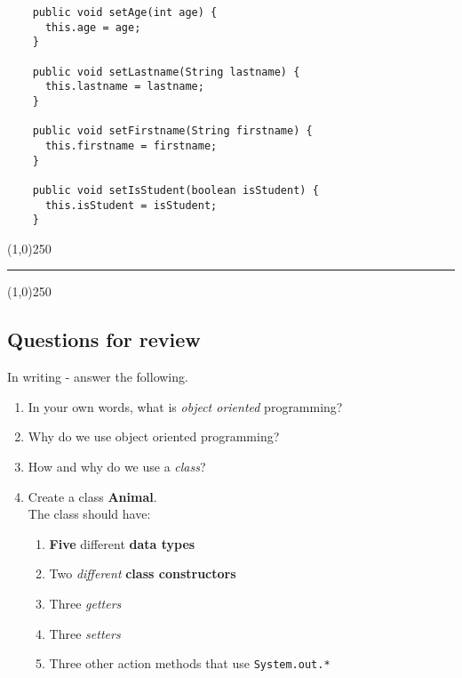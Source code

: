 \documentclass{article}
\begin{document}
\begin{flushleft}
\begin{tcolorbox}[enhanced,breakable, before upper={\let\clearpage\relax}, width=4in,center upper,
    fontupper=\bfseries,drop fuzzy shadow southeast,
    boxrule=0.4pt,sharp corners,colframe=gray!80!black,colback=gray!10]
  \begin{verbatim}
    public void setAge(int age) {
      this.age = age;
    }
    
    public void setLastname(String lastname) {
      this.lastname = lastname;
    }
    
    public void setFirstname(String firstname) {
      this.firstname = firstname;
    }
    
    public void setIsStudent(boolean isStudent) {
      this.isStudent = isStudent;
    }
  \end{verbatim}
\end{tcolorbox}


\newpage
\begin{center}
\line(1,0){250}
\end{center}
\noindent
\rule{\textwidth}{0.4pt}
\begin{center}
\line(1,0){250}
\end{center}
\subsection{{\LARGE Questions for review}}
           {\Large In writing - answer the following.}
           
\begin{enumerate}
\item In your own words, what is \emph{object oriented} programming?

\item Why do we use object oriented programming?

\item How and why do we use a \emph{class}?


\item Create a class \textbf{Animal}. \\The class should have:
  \\
   \begin{enumerate}
   \item \textbf{Five} different \textbf{data types}
   \item Two \emph{different} \textbf{class constructors}
   \item Three \emph{getters}
   \item Three \emph{setters}
   \item Three other action methods that use \texttt{System.out.*}
   \end{enumerate}


\end{enumerate}
\end{flushleft}
\end{document}
